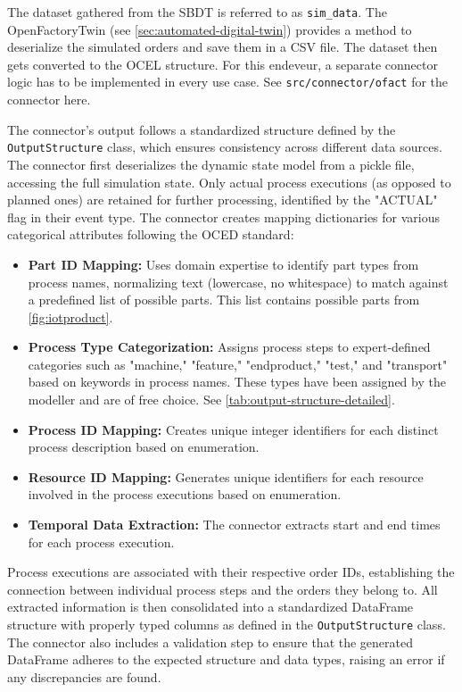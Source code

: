 The dataset gathered from the SBDT is referred to as \texttt{sim\_data}. The OpenFactoryTwin (see \autoref{sec:automated-digital-twin}) provides a method to deserialize the simulated orders and save them in a CSV file. The dataset then gets converted to the OCEL structure. For this endeveur, a separate connector logic has to be implemented in every use case. See \texttt{src/connector/ofact} for the connector here.

The connector's output follows a standardized structure defined by the \texttt{OutputStructure} class, which ensures consistency across different data sources. The connector first deserializes the dynamic state model from a pickle file, accessing the full simulation state. Only actual process executions (as opposed to planned ones) are retained for further processing, identified by the "ACTUAL" flag in their event type. The connector creates mapping dictionaries for various categorical attributes following the OCED standard:

\begin{itemize}
  \item \textbf{Part ID Mapping:} Uses domain expertise to identify part types from process names, normalizing text (lowercase, no whitespace) to match against a predefined list of possible parts. This list contains possible parts from \autoref{fig:iotproduct}.
  \item \textbf{Process Type Categorization:} Assigns process steps to expert-defined categories such as "machine," "feature," "endproduct," "test," and "transport" based on keywords in process names. These types have been assigned by the modeller and are of free choice. See \autoref{tab:output-structure-detailed}.
  \item \textbf{Process ID Mapping:} Creates unique integer identifiers for each distinct process description based on enumeration.
  \item \textbf{Resource ID Mapping:} Generates unique identifiers for each resource involved in the process executions based on enumeration.
  \item \textbf{Temporal Data Extraction:} The connector extracts start and end times for each process execution.
\end{itemize}

Process executions are associated with their respective order IDs, establishing the connection between individual process steps and the orders they belong to. All extracted information is then consolidated into a standardized DataFrame structure with properly typed columns as defined in the \texttt{OutputStructure} class. The connector also includes a validation step to ensure that the generated DataFrame adheres to the expected structure and data types, raising an error if any discrepancies are found.

